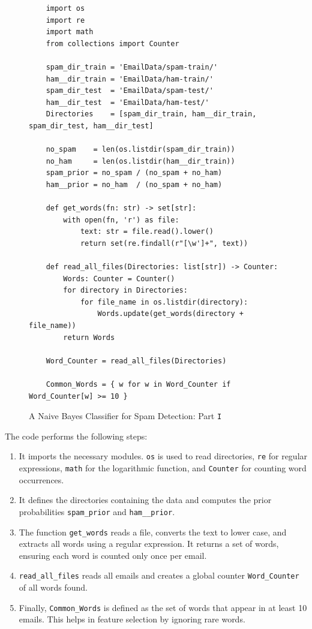 \begin{figure}[!ht]
\centering
\begin{verbatim}
    import os
    import re
    import math
    from collections import Counter
    
    spam_dir_train = 'EmailData/spam-train/'
    ham__dir_train = 'EmailData/ham-train/'
    spam_dir_test  = 'EmailData/spam-test/'
    ham__dir_test  = 'EmailData/ham-test/'
    Directories    = [spam_dir_train, ham__dir_train, spam_dir_test, ham__dir_test]
    
    no_spam    = len(os.listdir(spam_dir_train))
    no_ham     = len(os.listdir(ham__dir_train))
    spam_prior = no_spam / (no_spam + no_ham)
    ham__prior = no_ham  / (no_spam + no_ham)
    
    def get_words(fn: str) -> set[str]:
        with open(fn, 'r') as file:
            text: str = file.read().lower()
            return set(re.findall(r"[\w']+", text))
    
    def read_all_files(Directories: list[str]) -> Counter:
        Words: Counter = Counter()
        for directory in Directories:
            for file_name in os.listdir(directory):
                Words.update(get_words(directory + file_name))
        return Words
    
    Word_Counter = read_all_files(Directories)

    Common_Words = { w for w in Word_Counter if Word_Counter[w] >= 10 }
\end{verbatim}
\caption{A Naive Bayes Classifier for Spam Detection: Part \texttt{I}}
\label{fig:Spam-Detection.ipynb-1}
\end{figure}

The code performs the following steps:
\begin{enumerate}
\item It imports the necessary modules. \texttt{os} is used to read directories, \texttt{re} for regular
  expressions, \texttt{math} for the logarithmic function, and \texttt{Counter} for counting word occurrences.
\item It defines the directories containing the data and computes the prior probabilities \texttt{spam\_prior} and \texttt{ham\_\_prior}.
\item The function \texttt{get\_words} reads a file, converts the text to lower case, and extracts all words using a regular expression. It returns a set of words, ensuring each word is counted only once per email.
\item \texttt{read\_all\_files} reads all emails and creates a global counter \texttt{Word\_Counter} of all words found.
\item Finally, \texttt{Common\_Words} is defined as the set of words that appear in at least 10 emails. This helps in feature selection by ignoring rare words.
\end{enumerate}

